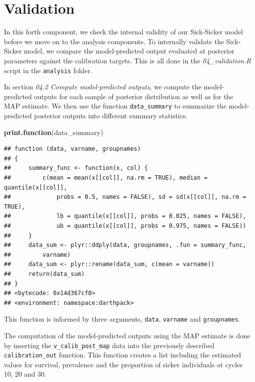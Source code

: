 \documentclass[
]{book}
\newenvironment{Shaded}{\begin{snugshade}}{\end{snugshade}}
\newcommand{\FunctionTok}[1]{\textcolor[rgb]{0.13,0.29,0.53}{\textbf{#1}}}
\newcommand{\NormalTok}[1]{#1}
\begin{document}
\chapter{Validation}\label{validation}

In this forth component, we check the internal validity of our Sick-Sicker model before we move on to the analysis components. To internally validate the Sick-Sicker model, we compare the model-predicted output evaluated at posterior parameters against the calibration targets. This is all done in the \emph{04\_validation.R} script in the \texttt{analysis} folder.

In section \emph{04.2 Compute model-predicted outputs}, we compute the model-predicted outputs for each sample of posterior distribution as well as for the MAP estimate. We then use the function \texttt{data\_summary} to summarize the model-predicted posterior outputs into different summary statistics.

\begin{Shaded}
\begin{Highlighting}[]
\FunctionTok{print.function}\NormalTok{(data\_summary)}
\end{Highlighting}
\end{Shaded}

\begin{verbatim}
## function (data, varname, groupnames) 
## {
##     summary_func <- function(x, col) {
##         c(mean = mean(x[[col]], na.rm = TRUE), median = quantile(x[[col]], 
##             probs = 0.5, names = FALSE), sd = sd(x[[col]], na.rm = TRUE), 
##             lb = quantile(x[[col]], probs = 0.025, names = FALSE), 
##             ub = quantile(x[[col]], probs = 0.975, names = FALSE))
##     }
##     data_sum <- plyr::ddply(data, groupnames, .fun = summary_func, 
##         varname)
##     data_sum <- plyr::rename(data_sum, c(mean = varname))
##     return(data_sum)
## }
## <bytecode: 0x14d367cf0>
## <environment: namespace:darthpack>
\end{verbatim}

This function is informed by three arguments, \texttt{data}, \texttt{varname} and \texttt{groupnames}.

The computation of the model-predicted outputs using the MAP estimate is done by inserting the \texttt{v\_calib\_post\_map} data into the previously described \texttt{calibration\_out} function. This function creates a list including the estimated values for survival, prevalence and the proportion of sicker individuals at cycles 10, 20 and 30.
\end{document}
